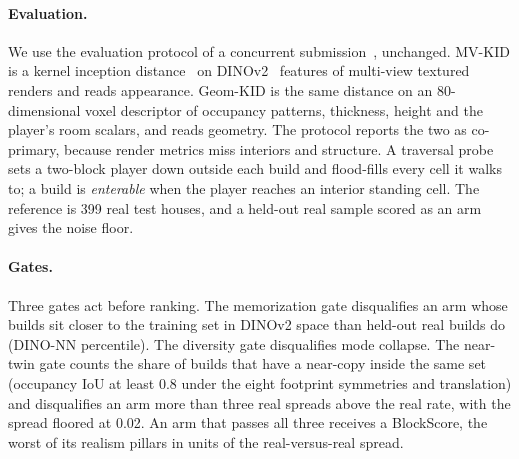 \paragraph{Evaluation.}
We use the evaluation protocol of a concurrent submission~\citep{anonymous2027blindness}, unchanged. %
MV-KID is a kernel inception distance~\citep{binkowski2018kid} on DINOv2~\citep{oquab2024dinov2} features of multi-view textured renders and reads appearance. %
Geom-KID is the same distance on an 80-dimensional voxel descriptor of occupancy patterns, thickness, height and the player's room scalars, and reads geometry. %
The protocol reports the two as co-primary, because render metrics miss interiors and structure. %
A traversal probe sets a two-block player down outside each build and flood-fills every cell it walks to; a build is \emph{enterable} when the player reaches an interior standing cell. %
The reference is 399 real test houses, and a held-out real sample scored as an arm gives the noise floor. %

\paragraph{Gates.}
Three gates act before ranking. The memorization gate disqualifies an arm whose builds sit closer to the training set in DINOv2 space than held-out real builds do (DINO-NN percentile). %
The diversity gate disqualifies mode collapse. %
The near-twin gate counts the share of builds that have a near-copy inside the same set (occupancy IoU at least 0.8 under the eight footprint symmetries and translation) and disqualifies an arm more than three real spreads above the real rate, with the spread floored at 0.02. %
An arm that passes all three receives a BlockScore, the worst of its realism pillars in units of the real-versus-real spread. %

